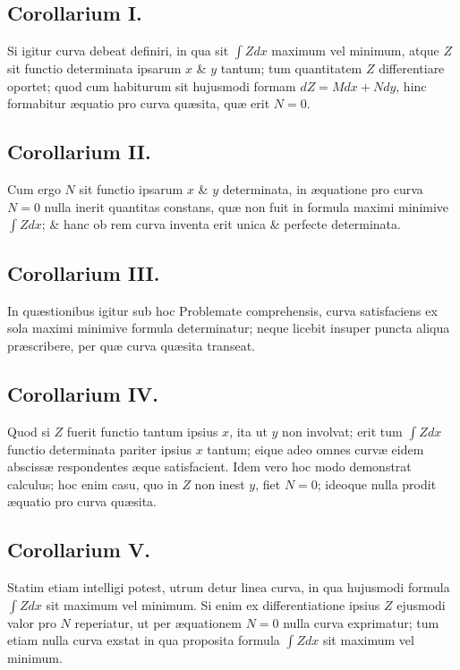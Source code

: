 \subsection*{Corollarium I.}
Si igitur curva debeat definiri, in qua sit $\int Zdx$ maximum vel minimum, atque $Z$ sit functio determinata ipsarum $x$ \& $y$ tantum; tum quantitatem $Z$ differentiare oportet; quod cum habiturum sit hujusmodi formam $dZ=Mdx+Ndy$, hinc formabitur æquatio pro curva quæsita, quæ erit $N=0$.

\subsection*{Corollarium II.}
Cum ergo $N$ sit functio ipsarum $x$ \& $y$ determinata, in æquatione pro curva $N=0$ nulla inerit quantitas constans, quæ non fuit in formula maximi minimive $\int Zdx$; \& hanc ob rem curva inventa erit unica \& perfecte determinata.

\subsection*{Corollarium III.}
In quæstionibus igitur sub hoc Problemate comprehensis, curva satisfaciens ex sola maximi minimive formula determinatur; neque licebit insuper puncta aliqua præscribere, per quæ curva quæsita transeat.

\subsection*{Corollarium IV.}
Quod si $Z$ fuerit functio tantum ipsius $x$, ita ut $y$ non involvat; erit tum $\int Zdx$ functio determinata pariter ipsius $x$ tantum; eique adeo omnes curvæ eidem abscissæ respondentes æque satisfacient. Idem vero hoc modo demonstrat calculus; hoc enim casu, quo in $Z$ non inest $y$, fiet $N=0$; ideoque nulla prodit æquatio pro curva quæsita.

\subsection*{Corollarium V.}
Statim etiam intelligi potest, utrum detur linea curva, in qua hujusmodi formula $\int Zdx$ sit maximum vel minimum. Si enim ex differentiatione ipsius $Z$ ejusmodi valor pro $N$ reperiatur, ut per æquationem $N=0$ nulla curva exprimatur; tum etiam nulla curva exstat in qua proposita formula $\int Zdx$ sit maximum vel minimum.

